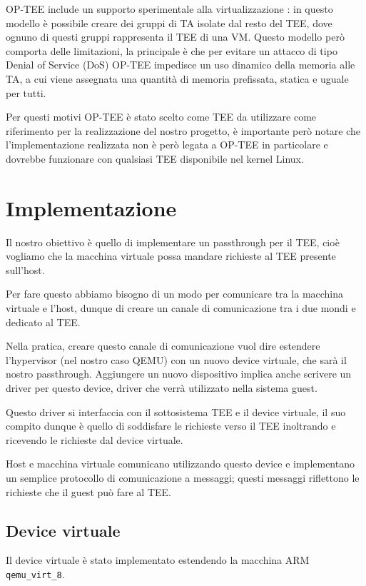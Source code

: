 \documentclass[12pt,italian]{report}
\begin{document}
OP-TEE include un supporto sperimentale alla virtualizzazione
\cite{optee_virtualization}: in questo
modello è possibile creare dei gruppi di TA isolate dal resto del TEE,
dove ognuno di questi gruppi rappresenta il TEE di una VM.
Questo modello però comporta delle limitazioni, la principale è che
per evitare un attacco di tipo Denial of Service (DoS) OP-TEE impedisce
un uso dinamico della memoria alle TA, a cui viene assegnata una quantità
di memoria prefissata, statica e uguale per tutti.

Per questi motivi OP-TEE è stato scelto come TEE da utilizzare
come riferimento per la realizzazione del nostro progetto, è
importante però notare che l'implementazione realizzata non è però
legata a OP-TEE in particolare e dovrebbe funzionare con qualsiasi
TEE disponibile nel kernel Linux.

\section{Implementazione}
\label{sec:implementazione}
Il nostro obiettivo è quello di implementare un passthrough per il TEE,
cioè vogliamo che la macchina virtuale possa mandare richieste al TEE
presente sull'host.

Per fare questo abbiamo bisogno di un modo per comunicare tra la macchina
virtuale e l'host, dunque di creare un canale di comunicazione tra i due
mondi e dedicato al TEE.

Nella pratica, creare questo canale di comunicazione vuol dire estendere
l'hypervisor (nel nostro caso QEMU) con un nuovo device virtuale, che sarà
il nostro passthrough.
Aggiungere un nuovo dispositivo implica anche scrivere un driver per
questo device, driver che verrà utilizzato nella sistema guest.

Questo driver si interfaccia con il sottosistema TEE e il device virtuale,
il suo compito dunque è quello di soddisfare le richieste verso il TEE
inoltrando e ricevendo le richieste dal device virtuale.

Host e macchina virtuale comunicano utilizzando questo device e implementano
un semplice protocollo di comunicazione a messaggi; questi messaggi
riflettono le richieste che il guest può fare al TEE. 

\subsection{Device virtuale}
Il device virtuale è stato implementato estendendo la macchina ARM
\texttt{qemu\_virt\_8}. 
\end{document}
